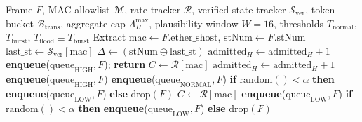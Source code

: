 \documentclass[journal]{IEEEtran}
\begin{document}
\begin{algorithm}[t]
\caption{PQAC Classification and Admission Control (v3)}
\label{alg:pqac}
\scriptsize
\begin{algorithmic}[1]
\REQUIRE Frame $F$, MAC allowlist $\mathcal{M}$, rate tracker $\mathcal{R}$, verified state tracker $\mathcal{S}_{\text{ver}}$, token bucket $\mathcal{B}_{\text{trans}}$, aggregate cap $\Lambda_H^{\max}$, plausibility window $W=16$, thresholds $T_{\text{normal}}$, $T_{\text{burst}}$, $T_{\text{flood}} \equiv T_{\text{burst}}$
\STATE Extract $\text{mac} \leftarrow F.\text{ether\_shost}$, $\text{stNum} \leftarrow F.\text{stNum}$
    \STATE $\text{last\_st} \leftarrow \mathcal{S}_{\text{ver}}[\text{mac}]$
    \STATE $\Delta \leftarrow (\text{stNum} \ominus \text{last\_st})$ 
    \IF{$\Delta \in (0, W]$ \AND $\text{consume\_token}(\mathcal{B}_{\text{trans}}[\text{mac}])$ \AND $\text{admitted}_H < \Lambda_H^{\max}$}
        \STATE $\text{admitted}_H \leftarrow \text{admitted}_H + 1$
        \STATE \textbf{enqueue}($\text{queue}_{\text{HIGH}}, F$); \textbf{return} 
    \ENDIF
    \STATE $C \leftarrow \mathcal{R}[\text{mac}]$ 
        \STATE $\text{admitted}_H \leftarrow \text{admitted}_H + 1$
        \STATE \textbf{enqueue}($\text{queue}_{\text{HIGH}}, F$) 
        \STATE \textbf{enqueue}($\text{queue}_{\text{NORMAL}}, F$) 
    \ELSE
        \STATE \textbf{if} $\text{random}() < \alpha$ \textbf{then} \textbf{enqueue}($\text{queue}_{\text{LOW}}, F$) \textbf{else} $\text{drop}(F)$ 
    \ENDIF
\ELSE
    \STATE $C \leftarrow \mathcal{R}[\text{mac}]$ 
        \STATE \textbf{enqueue}($\text{queue}_{\text{LOW}}, F$) 
    \ELSE
        \STATE \textbf{if} $\text{random}() < \alpha$ \textbf{then} \textbf{enqueue}($\text{queue}_{\text{LOW}}, F$) \textbf{else} $\text{drop}(F)$ 
    \ENDIF
\ENDIF
\STATE {}
\end{algorithmic}
\end{algorithm}
\end{document}
